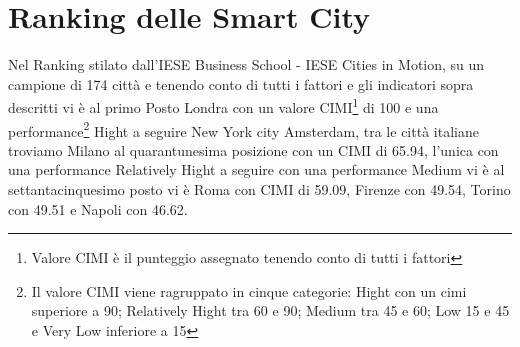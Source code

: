 \section{Ranking delle Smart City}
Nel Ranking stilato dall'IESE Business School - IESE Cities in Motion, su un campione di 174 città e tenendo conto di tutti i fattori e gli indicatori sopra descritti vi è al primo Posto Londra con un valore CIMI\footnote{Valore CIMI è il punteggio assegnato tenendo conto di tutti i fattori} di 100 e una performance\footnote{Il valore CIMI viene ragruppato in cinque categorie: Hight con un cimi superiore a 90; Relatively Hight tra 60 e 90; Medium tra 45 e 60; Low 15 e 45 e Very Low inferiore a 15 } Hight a seguire New York city Amsterdam, tra le città italiane troviamo Milano al quarantunesima posizione con un CIMI di 65.94, l'unica con una performance Relatively Hight a seguire con una performance Medium vi è al settantacinquesimo posto vi è Roma con CIMI di 59.09, Firenze con 49.54, Torino con 49.51 e Napoli con 46.62.



